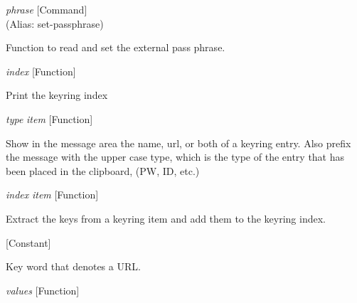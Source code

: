 \vspace{1em}
\noindent
{}
\usebox{\funcname}\emph{phrase}
 \hfill [Command]\\%
 (Alias: set-passphrase)

\begin{doc-string}
Function to read and set the external pass phrase.
\end{doc-string}

\vspace{1em}
\noindent
{}
\usebox{\funcname}\emph{index}
 \hfill [Function]

\begin{doc-string}
Print the keyring index
\end{doc-string}

\vspace{1em}
\noindent
{}
\usebox{\funcname}\emph{type} \emph{item}
 \hfill [Function]

\begin{doc-string}
Show in the message area the name, url, or both of a keyring entry.  Also prefix
the message with the upper case type, which is the type of the entry that has been
placed in the clipboard, (PW, ID, etc.)
\end{doc-string}

\vspace{1em}
\noindent
{}
\usebox{\funcname}\emph{index} \emph{item}
 \hfill [Function]

\begin{doc-string}
Extract the keys from a keyring item and add them to the keyring index.
\end{doc-string}

\vspace{1em}
\noindent
{}
\usebox{\funcname}
 \hfill [Constant]

\begin{doc-string}
Key word that denotes a URL.
\end{doc-string}

\vspace{1em}
\noindent
{}
\usebox{\funcname}\emph{values}
 \hfill [Function]

